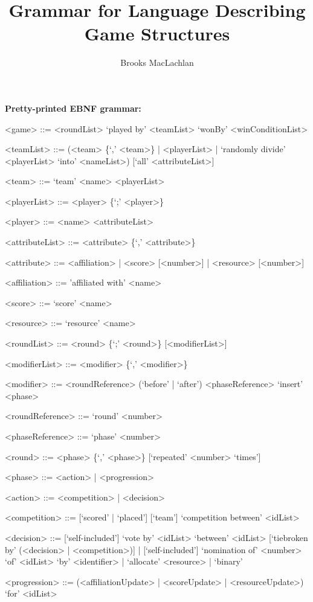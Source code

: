 \documentclass{article}
\title{Grammar for Language Describing Game Structures}
\author{Brooks MacLachlan}
\begin{document}
\maketitle

\noindent \textbf{Pretty-printed EBNF grammar:}
\begin{grammar}
<game> ::= <roundList> `played by' <teamList> `wonBy' <winConditionList>

<teamList> ::= (<team> \{`,' <team>\} | <playerList> | `randomly divide' 
<playerList> `into' <nameList>) [`all' <attributeList>]

<team> ::= `team' <name> <playerList>

<playerList> ::= <player> \{`;' <player>\}

<player> ::= <name> <attributeList>

<attributeList> ::= <attribute> \{`,' <attribute>\}

<attribute> ::= <affiliation> | <score> [<number>] | <resource> [<number>]

<affiliation> ::= 'affiliated with' <name>

<score> ::= `score' <name>

<resource> ::= `resource' <name>

<roundList> ::= <round> \{`;' <round>\} [<modifierList>]

<modifierList> ::= <modifier> \{`,' <modifier>\}

<modifier> ::= <roundReference> (`before' | `after') <phaseReference> `insert' 
<phase>

<roundReference> ::= `round' <number>

<phaseReference> ::= `phase' <number>

<round> ::= <phase> \{`,' <phase>\} [`repeated' <number> `times']

<phase> ::= <action> | <progression>

<action> ::= <competition> | <decision>

<competition> ::= [`scored' | `placed'] [`team'] `competition between' <idList> 

<decision> ::= [`self-included'] `vote by' <idList> `between' <idList> 
[`tiebroken by' 
(<decision> | <competition>)] | [`self-included'] `nomination of' <number> 
`of' <idList> `by' <identifier> | `allocate' <resource> | `binary' %

<progression> ::= (<affiliationUpdate> | <scoreUpdate>  | <resourceUpdate>) 
`for' <idList>


\end{grammar}
\end{document}

